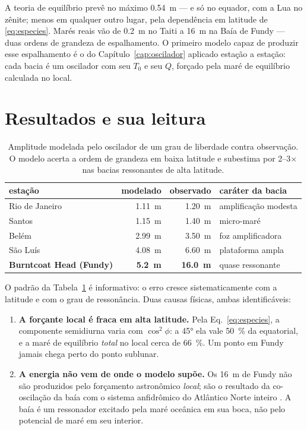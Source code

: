 \documentclass[11pt,a4paper,oneside]{report}
\theoremstyle{definition}
\theoremstyle{plain}
\theoremstyle{remark}
\begin{document}
A teoria de equilíbrio prevê no máximo \SI{0.54}{\meter} — e só no equador, com
a Lua no zênite; menos em qualquer outro lugar, pela dependência em latitude de
\eqref{eq:especies}. Marés reais vão de
\SI{0.2}{\meter} no Taiti a \SI{16}{\meter} na Baía de Fundy — duas ordens de
grandeza de espalhamento. O primeiro modelo capaz de produzir esse
espalhamento é o do Capítulo~\ref{cap:oscilador} aplicado estação a estação:
cada bacia é um oscilador com seu $T_0$ e seu $Q$, forçado pela maré de
equilíbrio calculada no local.

\section{Resultados e sua leitura}

\begin{table}[htbp]
\centering
\caption{Amplitude modelada pelo oscilador de um grau de liberdade contra
observação. O modelo acerta a ordem de
grandeza em baixa latitude e subestima por 2--3$\times$ nas bacias
ressonantes de alta latitude.}
\label{tab:estacoes}
\begin{tabular}{@{}lrrl@{}}
\toprule
estação & modelado & observado & caráter da bacia \\
\midrule
Rio de Janeiro & \SI{1.11}{\meter} & \SI{1.20}{\meter} & amplificação modesta \\
Santos & \SI{1.15}{\meter} & \SI{1.40}{\meter} & micro-maré \\
Belém & \SI{2.99}{\meter} & \SI{3.50}{\meter} & foz amplificadora \\
São Luís & \SI{4.08}{\meter} & \SI{6.60}{\meter} & plataforma ampla \\
\textbf{Burntcoat Head (Fundy)} & \textbf{\SI{5.2}{\meter}} & \textbf{\SI{16.0}{\meter}} & quase ressonante \\
\bottomrule
\end{tabular}
\end{table}

O padrão da Tabela~\ref{tab:estacoes} é informativo: o erro cresce
sistematicamente com a latitude e com o grau de ressonância. Duas causas
físicas, ambas identificáveis:

\begin{enumerate}
\item \textbf{A forçante local é fraca em alta latitude.} Pela
  Eq.~\eqref{eq:especies}, a componente semidiurna varia com $\cos^{2}\phi$: a
  \ang{45} ela vale \SI{50}{\percent} da equatorial, e a maré de equilíbrio
  \emph{total} no local cerca de \SI{66}{\percent}. Um ponto em Fundy jamais
  chega perto do ponto sublunar.
\item \textbf{A energia não vem de onde o modelo supõe.} Os \SI{16}{\meter} de
  Fundy não são produzidos pelo forçamento astronômico \emph{local}; são o
  resultado da co-oscilação da baía com o sistema anfidrômico do Atlântico
  Norte inteiro \cite{garrett1972}. A baía é um ressonador excitado pela maré
  oceânica em sua boca, não pelo potencial de maré em seu interior.
\end{enumerate}
\end{document}
